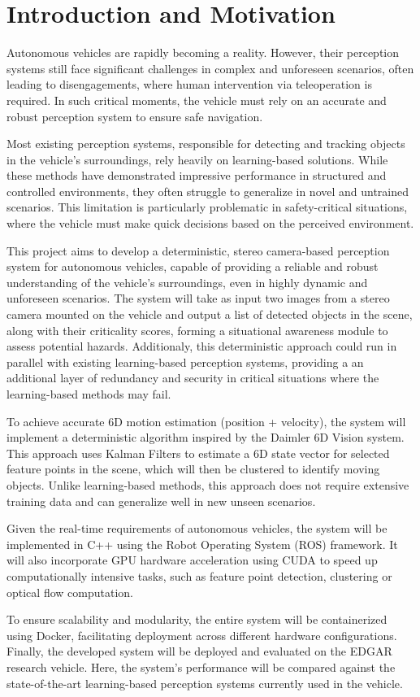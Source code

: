 \chapter{Introduction and Motivation}%
\label{chap:Introduction}%


Autonomous vehicles are rapidly becoming a reality. However, their perception systems still face significant challenges 
in complex and unforeseen scenarios, often leading to disengagements, where human intervention via teleoperation is required. 
In such critical moments, the vehicle must rely on an accurate and robust perception system to ensure safe navigation. 

Most existing perception systems, responsible for detecting and tracking objects in the vehicle's surroundings, rely heavily
on learning-based solutions. While these methods have demonstrated impressive performance in structured and controlled environments, 
they often struggle to generalize in novel and untrained scenarios. This limitation is particularly problematic in safety-critical
situations, where the vehicle must make quick decisions based on the perceived environment.

This project aims to develop a deterministic, stereo camera-based perception system for autonomous vehicles, capable of providing
a reliable and robust understanding of the vehicle's surroundings, even in highly dynamic and unforeseen scenarios. The system
will take as input two images from a stereo camera mounted on the vehicle and output a list of detected objects in the scene, along
with their criticality scores, forming a situational awareness module to assess potential hazards. 
Additionaly, this deterministic approach could run in parallel with existing learning-based perception systems, providing a
an additional layer of redundancy and security in critical situations where the learning-based methods may fail.

To achieve accurate 6D motion estimation (position + velocity), the system will implement a deterministic algorithm 
inspired by the Daimler 6D Vision system. This approach uses Kalman Filters to estimate a 6D state vector for selected feature
points in the scene, which will then be clustered to identify moving objects. Unlike learning-based methods, this approach
does not require extensive training data and can generalize well in new unseen scenarios.

Given the real-time requirements of autonomous vehicles, the system will be implemented in C++ using the Robot Operating System (ROS)
framework. It will also incorporate GPU hardware acceleration using CUDA to speed up computationally intensive tasks, such as
feature point detection, clustering or optical flow computation.  

To ensure scalability and modularity, the entire system will be containerized using Docker, facilitating deployment across different
hardware configurations. Finally, the developed system will be deployed and evaluated on the EDGAR research vehicle. Here, 
the system's performance will be compared against the state-of-the-art learning-based perception systems currently used in the vehicle.


